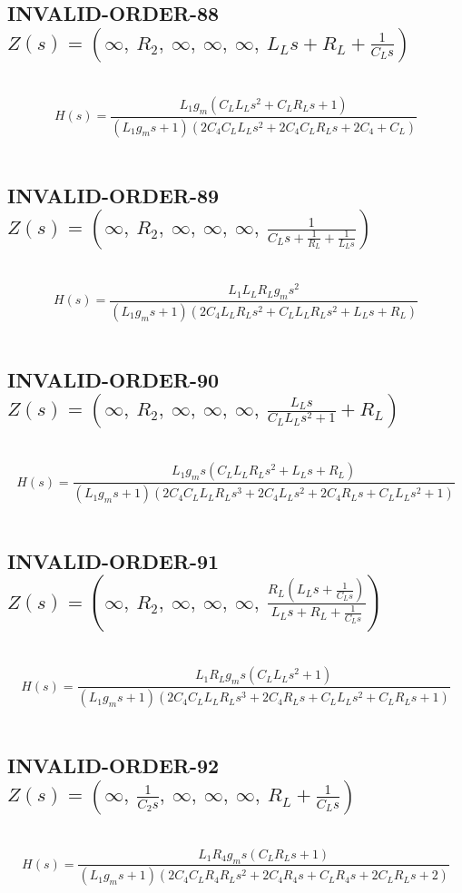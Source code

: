 \documentclass{article}
\begin{document}
\subsection{INVALID-ORDER-88 $Z(s) = \left( \infty, \  R_{2}, \  \infty, \  \infty, \  \infty, \  L_{L} s + R_{L} + \frac{1}{C_{L} s}\right)$ } \ 
\textbf{\[H(s) = \frac{L_{1} g_{m} \left(C_{L} L_{L} s^{2} + C_{L} R_{L} s + 1\right)}{\left(L_{1} g_{m} s + 1\right) \left(2 C_{4} C_{L} L_{L} s^{2} + 2 C_{4} C_{L} R_{L} s + 2 C_{4} + C_{L}\right)}\] } \ 
\subsection{INVALID-ORDER-89 $Z(s) = \left( \infty, \  R_{2}, \  \infty, \  \infty, \  \infty, \  \frac{1}{C_{L} s + \frac{1}{R_{L}} + \frac{1}{L_{L} s}}\right)$ } \ 
\textbf{\[H(s) = \frac{L_{1} L_{L} R_{L} g_{m} s^{2}}{\left(L_{1} g_{m} s + 1\right) \left(2 C_{4} L_{L} R_{L} s^{2} + C_{L} L_{L} R_{L} s^{2} + L_{L} s + R_{L}\right)}\] } \ 
\subsection{INVALID-ORDER-90 $Z(s) = \left( \infty, \  R_{2}, \  \infty, \  \infty, \  \infty, \  \frac{L_{L} s}{C_{L} L_{L} s^{2} + 1} + R_{L}\right)$ } \ 
\textbf{\[H(s) = \frac{L_{1} g_{m} s \left(C_{L} L_{L} R_{L} s^{2} + L_{L} s + R_{L}\right)}{\left(L_{1} g_{m} s + 1\right) \left(2 C_{4} C_{L} L_{L} R_{L} s^{3} + 2 C_{4} L_{L} s^{2} + 2 C_{4} R_{L} s + C_{L} L_{L} s^{2} + 1\right)}\] } \ 
\subsection{INVALID-ORDER-91 $Z(s) = \left( \infty, \  R_{2}, \  \infty, \  \infty, \  \infty, \  \frac{R_{L} \left(L_{L} s + \frac{1}{C_{L} s}\right)}{L_{L} s + R_{L} + \frac{1}{C_{L} s}}\right)$ } \ 
\textbf{\[H(s) = \frac{L_{1} R_{L} g_{m} s \left(C_{L} L_{L} s^{2} + 1\right)}{\left(L_{1} g_{m} s + 1\right) \left(2 C_{4} C_{L} L_{L} R_{L} s^{3} + 2 C_{4} R_{L} s + C_{L} L_{L} s^{2} + C_{L} R_{L} s + 1\right)}\] } \ 
\subsection{INVALID-ORDER-92 $Z(s) = \left( \infty, \  \frac{1}{C_{2} s}, \  \infty, \  \infty, \  \infty, \  R_{L} + \frac{1}{C_{L} s}\right)$ } \ 
\textbf{\[H(s) = \frac{L_{1} R_{4} g_{m} s \left(C_{L} R_{L} s + 1\right)}{\left(L_{1} g_{m} s + 1\right) \left(2 C_{4} C_{L} R_{4} R_{L} s^{2} + 2 C_{4} R_{4} s + C_{L} R_{4} s + 2 C_{L} R_{L} s + 2\right)}\] } \ 
\end{document}
